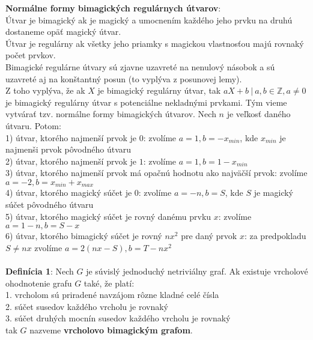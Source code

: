 \documentclass[12pt]{article}
\begin{document}
\textbf{Normálne formy bimagických regulárnych útvarov}: \\

Útvar je bimagický ak je magický a umocnením každého jeho prvku na druhú dostaneme opäť magický útvar. \\

Útvar je regulárny ak všetky jeho priamky s magickou vlastnosťou majú rovnaký počet prvkov. \\

Bimagické regulárne útvary sú zjavne uzavreté na nenulový násobok a sú uzavreté aj na konštantný posun (to vyplýva z posunovej lemy). \\

Z toho vyplýva, že ak $X$ je bimagický regulárny útvar, tak $aX+b ~|~ a,b \in \mathbb{Z}, a \neq 0$ je bimagický regulárny útvar s potenciálne nekladnými prvkami. Tým vieme vytvárať tzv. normálne formy bimagických útvarov. Nech $n$ je veľkosť daného útvaru. Potom: \\
1) útvar, ktorého najmenší prvok je $0$: zvolíme $a = 1, b = - x_{min}$, kde $x_{min}$ je najmenši prvok pôvodného útvaru \\
2) útvar, ktorého najmenší prvok je $1$: zvolíme $a = 1, b = 1 - x_{min}$ \\
3) útvar, ktorého najmenší prvok má opačnú hodnotu ako najväčší prvok: zvolíme $a = -2, b = x_{min} + x_{max}$ \\
4) útvar, ktorého magický súčet je $0$: zvolíme $a = -n, b = S$, kde $S$ je magický súčet pôvodného útvaru \\
5) útvar, ktorého magický súčet je rovný danému prvku $x$: zvolíme $a = 1-n, b = S-x$ \\
6) útvar, ktorého bimagický súčet je rovný $nx^2$ pre daný prvok $x$: za predpokladu $S \neq nx$ zvolíme $a = 2(nx - S), b = T - nx^2$ \\\\


\textbf{Definícia 1}: Nech $G$ je súvislý jednoduchý netriviálny graf. Ak existuje vrcholové ohodnotenie grafu $G$ také, že platí: \\
1. vrcholom sú priradené navzájom rôzne kladné celé čísla \\
2. súčet susedov každého vrcholu je rovnaký \\
3. súčet druhých mocnín susedov každého vrcholu je rovnaký \\
tak $G$ nazveme \textbf{vrcholovo bimagickým grafom}. \\
\end{document}
